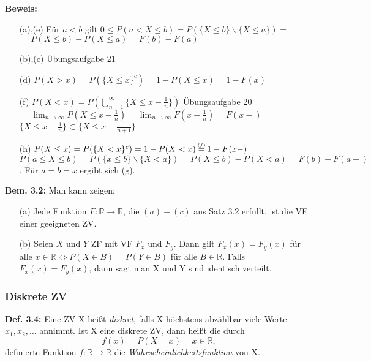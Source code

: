 \documentclass[a4paper,11pt]{article}
\newcommand\fover{\overset{\mathclap{\scriptscriptstyle (f)}}{=}}
\begin{document}
\vspace{6pt}
\noindent\textbf{Beweis:} 
\begin{itemize}
\item[(a),(e)] Für $a<b$ gilt $0\leq P(a<X\leq b) = P(\{X\leq b\}\backslash \{X\leq a\}) = $
    \newline $= P(X\leq b) - P(X\leq a) = F(b) - F(a)$
\item[(b),(c)] Übungsaufgabe 21
\item[(d)] $P(X>x) = P(\{X\leq x\}^c) = 1-P(X\leq x)=1-F(x)$
\item[(f)] $P(X<x)=P(\bigcup_{n=1}^{\infty}\{X\leq x-\frac{1}{n}\})$
    \newline Übungsaufgabe 20 $= \lim_{n\rightarrow\infty}P(X\leq x-\frac{1}{n}) = \lim_{n\rightarrow\infty}F(x-\frac{1}{n}) = F(x-)$
    \newline $\{X\leq x-\frac{1}{n}\}\subset\{X\leq x-\frac{1}{n+1}\}$
\item[(h)] $P(X\leq x) = P(\{X<x\}^c)=1-P(X<x) \fover 1-F(x-)$
    \newline $P(a\leq X\leq b) = P(\{x\leq b\} \backslash \{X<a\}) = P(X\leq b) - P(X<a) = F(b) - F(a-)$.
    \newline Für $a=b=x$ ergibt sich (g).
\end{itemize}

\vspace{6pt}
\noindent\textbf{Bem. 3.2:} Man kann zeigen: 
\begin{itemize}
\item[(a)] Jede Funktion $F:\mathbb{R}\rightarrow\mathbb{R}$, die $(a)-(c)$ aus Satz 3.2 erfüllt, ist die VF einer geeigneten ZV.
\item[(b)] Seien $X$ und $Y$ ZF mit VF $F_x$ und $F_y$. Dann gilt
    \newline $F_x(x)=F_y(x)$ für alle $x\in\mathbb{R} \Leftrightarrow P(X\in B) = P(Y\in B)$ für alle $B\in\mathbb{R}$.
    \newline Falls $F_x(x)=F_y(x)$, dann sagt man \glqq X und Y sind identisch verteilt\grqq.
\end{itemize}

\subsubsection{Diskrete ZV}
\vspace{6pt}
\noindent\textbf{Def. 3.4:} Eine ZV X heißt \textit{diskret}, falls X höchstens abzählbar viele Werte $x_1,x_2,\dots$ annimmt. 
\newline Ist X eine diskrete ZV, dann heißt die durch 
\[f(x)=P(X=x) \hspace{15pt} x\in\mathbb{R},\]
definierte Funktion $f:\mathbb{R}\rightarrow\mathbb{R}$ die \textit{Wahrscheinlichkeitsfunktion} von X.
\end{document}
